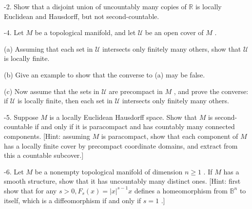 \begin{exercise}
\label{prob:1-2}
-2. Show that a disjoint union of uncountably many copies of $\mathbb{R}$ is locally Euclidean and Hausdorff, but not second-countable.
\end{exercise}

\begin{exercise}
\label{prob:1-4}
-4. Let $M$ be a topological manifold, and let $\mathcal{U}$ be an open cover of $M$ .

(a) Assuming that each set in $\mathcal{U}$ intersects only finitely many others, show that $\mathcal{U}$ is locally finite.

(b) Give an example to show that the converse to (a) may be false.

(c) Now assume that the sets in $\mathcal{U}$ are precompact in $M$ , and prove the converse: if $\mathcal{U}$ is locally finite, then each set in $\mathcal{U}$ intersects only finitely many others.
\end{exercise}

\begin{exercise}
\label{prob:1-5}
-5. Suppose $M$ is a locally Euclidean Hausdorff space. Show that $M$ is second-countable if and only if it is paracompact and has countably many connected components. [Hint: assuming $M$ is paracompact, show that each component of $M$ has a locally finite cover by precompact coordinate domains, and extract from this a countable subcover.]
\end{exercise}

\begin{exercise}
\label{prob:1-6}
-6. Let $M$ be a nonempty topological manifold of dimension $n \geq  1$ . If $M$ has a smooth structure, show that it has uncountably many distinct ones. [Hint: first show that for any $s > 0,{F}_{s}\left( x\right)  = {\left| x\right| }^{s - 1}x$ defines a homeomorphism from ${\mathbb{B}}^{n}$ to itself, which is a diffeomorphism if and only if $s = 1$ .]
\end{exercise}

